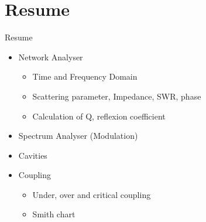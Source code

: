 \documentclass{beamer}
\begin{document}
\section{Resume}
\begin{frame}[t,fragile]{Resume}
\begin{itemize}
\item Network Analyser
\begin{itemize}
\item Time and Frequency Domain
\item Scattering parameter, Impedance, SWR, phase
\item Calculation of Q, reflexion coefficient
\end{itemize}
\item Spectrum Analyser (Modulation)

\item Cavities
\item Coupling
\begin{itemize}
\item Under, over and critical coupling  
\item Smith chart
\end{itemize}
\end{itemize}
\begin{figure}
  \centering
  \quad
\end{figure}
\end{frame}
\end{document}
